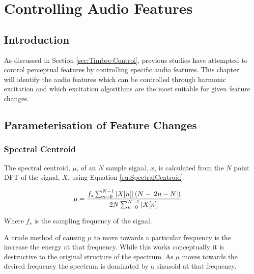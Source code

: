 
\chapter{Controlling Audio Features} %
\label{chap:FeatureControl}

\section{Introduction}
\label{sec:FeatureControl-Introduction}
	As discussed in Section \ref{sec:Timbre-Control}, previous studies have attempted to control perceptual features by 
	controlling specific audio features. This chapter will identify the audio features which can be controlled through 
	harmonic excitation and which excitation algorithms are the most suitable for given feature changes. 

\section{Parameterisation of Feature Changes}
\label{sec:FeatureControl-Parameterisation}
	\subsection{Spectral Centroid}
	\label{sec:FeatureControl-Parameterisation-SpectralCentroid}
		The spectral centroid, $\mu$, of an $N$ sample signal, $x$, is calculated from the $N$ point DFT of the
		signal, $X$, using Equation \ref{eq:SpectralCentroid}.

		\begin{equation}
			\mu = \frac{f_{s}\sum_{n = 0}^{N-1} \left|X[n]\right|(N - \left|2n - N\right|)}
				   {2N\sum_{n = 0}^{N-1} \left|X[n]\right|}
			\label{eq:SpectralCentroid}
		\end{equation}

		Where $f_{s}$ is the sampling frequency of the signal.

		A crude method of causing $\mu$ to move towards a particular frequency is
		the increase the energy at that frequency. While this works conceptually it is destructive to the original
		structure of the spectrum. As $\mu$ moves towards the desired frequency the spectrum is dominated by a
		sinusoid at that frequency.

